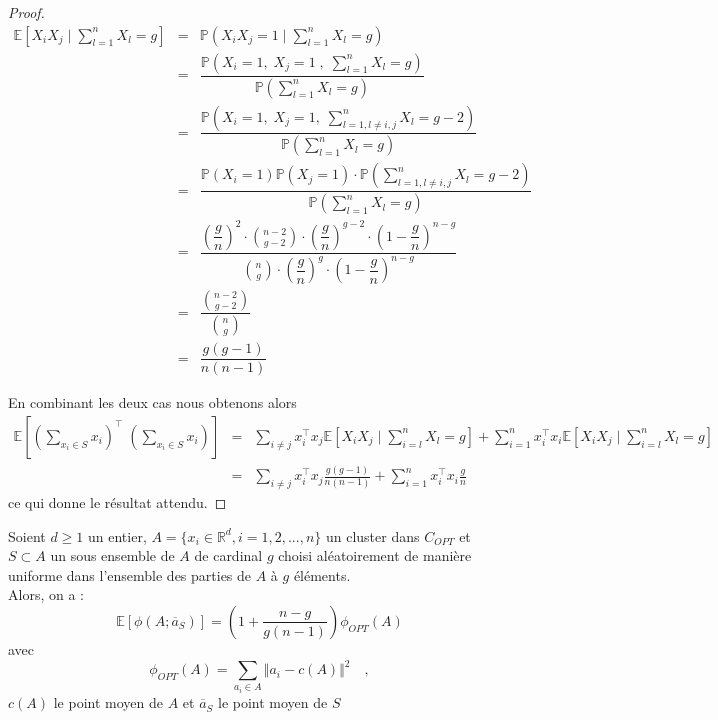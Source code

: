 \documentclass[12pt,a4paper]{book}
\newcommand{\R}{\mathbb{R}}
\newcommand{\E}{\mathbb{E}}
\newcommand{\p}{\mathbb{P}}
\newcommand{\1}{\mathds{1}}
\begin{document}
\begin{proof}
		\begin{eqnarray*}
			\E \left[ X_i X_j\; | \; \sum_{l=1}^n X_l = g \right] &=& \p \left( X_i X_j = 1 \; | \; \sum_{l=1}^n X_l = g \right) \\
			&=& \dfrac{\p \left( X_i = 1, \; X_j = 1 \; , \; \displaystyle \sum_{l=1}^n X_l = g \right)}{\p \left(\displaystyle \sum_{l=1}^n X_l = g \right)} \\
			&=& \dfrac{\p \left( X_i = 1 , \; X_j = 1 , \; \displaystyle \sum_{l=1, l\neq i,j}^n X_l = g-2 \right)}{\p \left(\displaystyle \sum_{l=1}^n X_l = g \right)} \\
			&=& \dfrac{\p \left( X_i = 1 \right) \p \left( X_j = 1 \right) \cdot \p \left( \displaystyle \sum_{l=1, l\neq i,j}^n X_l = g-2 \right)}{\p \left(\displaystyle \sum_{l=1}^n X_l = g \right)}\\
			&=& \dfrac{\left(\dfrac{g}{n}\right)^2 \cdot \displaystyle {n-2 \choose g-2} \cdot \left(\dfrac{g}{n}\right)^{g-2} \cdot \left(1 - \dfrac{g}{n}\right)^{n-g} } {\displaystyle {n \choose g} \cdot \left(\dfrac{g}{n}\right)^{g} \cdot \left(1 - \dfrac{g}{n}\right)^{n-g} } \\
			&=& \dfrac{\displaystyle {n-2 \choose g-2}} {\displaystyle {n \choose g}} \\
			&=& \dfrac{g(g-1)}{n(n-1)}
		\end{eqnarray*}
		
		En combinant les deux cas nous obtenons alors  
		\begin{eqnarray*}
			\E \left[ \left( \sum_{x_i \in S} x_i \right)^\intercal \; \left( \sum_{x_i \in S} x_i \right) \right] &=& \sum_{ i \neq j} x_i^\intercal x_j \E \left[ X_i X_j \; | \; \sum_{i=l}^n X_l = g \right] + \sum_{i=1}^n x_i^\intercal x_i \E \left[ X_i X_j \; | \; \sum_{i=l}^n X_l = g \right] \\
			&=& \sum_{ i \neq j} x_i^\intercal x_j \frac{g(g-1)}{n(n-1)} + \sum_{i=1}^n x_i^\intercal x_i \frac{g}{n}
		\end{eqnarray*}
		ce qui donne le résultat attendu.
	\end{proof}
	
	
	\begin{env_lemme}\label{lemme4.1}
		Soient $d \geq 1$ un entier, $A = \{ x_i \in \R^d, i=1,2, ..., n \}$ un cluster dans $C_{OPT}$ et $S \subset A$ un sous ensemble de $A$ de cardinal $g$ choisi aléatoirement de manière uniforme dans l'ensemble des parties de $A$ à $g$ éléments.\\
		Alors, on a :
		$$
			\E \left[ \phi\left(A;\overline{a}_S \right) \right] = \left(1 + \frac{n-g}{g(n-1)} \right) \phi_{OPT}(A)
		$$		
		avec 
		$$
			\phi_{OPT}(A) = \sum_{a_i \in A} \Vert a_i - c(A) \Vert^2 \quad ,
		$$
		$c(A)$ le point moyen de $A$ et $\overline{a}_S$ le point moyen de $S$
	\end{env_lemme}	
	
\end{document}
